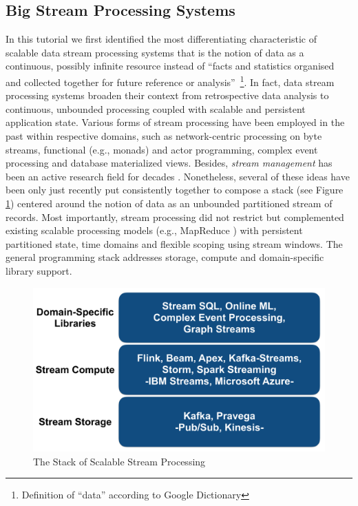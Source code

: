 
\subsection{Big Stream Processing Systems} 
\label{sec:tut_systems}

In this tutorial we first identified the most differentiating characteristic of scalable data stream processing systems that is the notion of data as a continuous, possibly infinite resource instead of ``facts and statistics organised and collected together for future reference or analysis''~\footnote{Definition of ``data'' according to Google Dictionary}. In fact, data stream processing systems broaden their context from retrospective data analysis to continuous, unbounded processing coupled with scalable and persistent application state.  Various forms of stream processing have been employed in the past within respective domains, such as network-centric processing on byte streams, functional (e.g., monads) and actor programming, complex event processing and database materialized views. Besides, \emph{stream management} has been an active research field for decades \cite{cherniack2003scalable,chandrasekaran2003telegraphcq,abadi2003aurora,arasu2004stream}. Nonetheless, several of these ideas have been only just recently put consistently together to compose a stack (see Figure \ref{fig:streamstack}) centered around the notion of data as an unbounded partitioned stream of records. Most importantly, stream processing did not restrict but complemented existing scalable processing models (e.g., MapReduce \cite{dean2008mapreduce}) with persistent partitioned state, time domains and flexible scoping using stream windows. The general programming stack  addresses storage, compute and domain-specific library support.

\begin{figure}[t]
\centering
\includegraphics[width=0.4 \textwidth]{pictures/streamstack.pdf}
\caption{The Stack of Scalable Stream Processing}
\label{fig:streamstack}
\end{figure}

